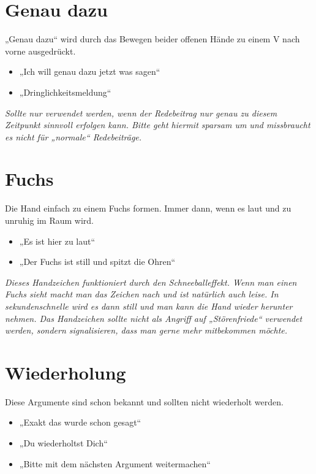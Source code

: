 \section{Genau dazu} %
„Genau dazu“ wird durch das Bewegen beider offenen Hände zu einem V nach vorne
ausgedrückt.
\begin{itemize}
	\item „Ich will genau dazu jetzt was sagen“
	\item „Dringlichkeitsmeldung“
\end{itemize}
\emph{Sollte nur verwendet werden, wenn der Redebeitrag nur genau zu diesem
Zeitpunkt sinnvoll erfolgen kann. Bitte geht hiermit sparsam um und missbraucht
es nicht für „normale“ Redebeiträge.}

\section{Fuchs} %
Die Hand einfach zu einem Fuchs formen. Immer dann, wenn es laut und zu unruhig
im Raum wird.
\begin{itemize}
	\item „Es ist hier zu laut“
	\item „Der Fuchs ist still und spitzt die Ohren“
\end{itemize}
\emph{Dieses Handzeichen funktioniert durch den Schneeballeffekt. Wenn man
einen Fuchs sieht macht man das Zeichen nach und ist natürlich auch leise. In
sekundenschnelle wird es dann still und man kann die Hand wieder herunter
nehmen. Das Handzeichen sollte nicht als Angriff auf „Störenfriede“ verwendet
werden, sondern signalisieren, dass man gerne mehr mitbekommen möchte.}

\section{Wiederholung}
Diese Argumente sind schon bekannt und sollten nicht wiederholt werden.
\begin{itemize}
	\item „Exakt das wurde schon gesagt“
	\item „Du wiederholtst Dich“
	\item „Bitte mit dem nächsten Argument weitermachen“
\end{itemize}
